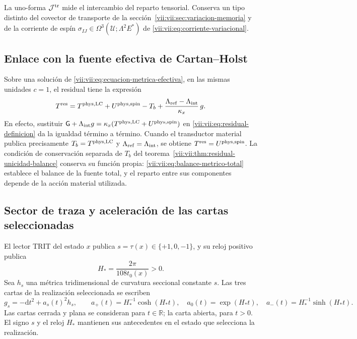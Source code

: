 La uno-forma \(\mathcal J^{\rm tr}\) mide el intercambio del reparto
tensorial. Conserva un tipo distinto del covector de transporte de la
sección~\ref{vii:vii:sec:variacion-memoria} y de la corriente de espín
\(\sigma_{IJ}\in\Omega^3(\mathcal U;\Lambda^2E^*)\) de
\eqref{vii:vii:eq:corriente-variacional}.

\subsection{Enlace con la fuente efectiva de Cartan--Holst}
\label{vii:vii:subsec:residual-fuente-cartan}

Sobre una solución de \eqref{vii:vii:eq:ecuacion-metrica-efectiva}, en las
mismas unidades \(c=1\), el residual tiene la expresión
\begin{equation}
 T^{\rm res}
 =T^{\rm phys,LC}+U^{\rm phys,spin}-T_b
   +\frac{\Lambda_{\rm ref}-\Lambda_{\rm int}}{\kappa_x}\,g.
 \label{vii:vii:eq:residual-composicion-cartan}
\end{equation}
En efecto, sustituir
\(\mathsf G+\Lambda_{\rm int}g
  =\kappa_x(T^{\rm phys,LC}+U^{\rm phys,spin})\)
en \eqref{vii:vii:eq:residual-definicion} da la igualdad término a término.
Cuando el transductor material publica precisamente
\(T_b=T^{\rm phys,LC}\) y \(\Lambda_{\rm ref}=\Lambda_{\rm int}\),
se obtiene \(T^{\rm res}=U^{\rm phys,spin}\).
La condición de conservación separada de \(T_b\) del
teorema~\ref{vii:vii:thm:residual-unicidad-balance} conserva su función
propia: \eqref{vii:vii:eq:balance-metrico-total} establece el balance de la
fuente total, y el reparto entre sus componentes depende de la acción
material utilizada.

\subsection{Sector de traza y aceleración de las cartas seleccionadas}
\label{vii:vii:subsec:residual-aceleracion-ds}

El lector TRIT del estado \(x\) publica \(s=\tau(x)\in\{+1,0,-1\}\),
y su reloj positivo publica
\begin{equation}
 H_*=\frac{2\pi}{108t_0(x)}>0.
 \label{vii:vii:eq:reloj-carta-ds}
\end{equation}
Sea \(h_s\) una métrica tridimensional de curvatura seccional constante
\(s\). Las tres cartas de la realización seleccionada se escriben
\begin{equation}
 g_s=-\mathrm dt^2+a_s(t)^2h_s,\qquad
 a_+(t)=H_*^{-1}\cosh(H_*t),\quad
 a_0(t)=\exp(H_*t),\quad
 a_-(t)=H_*^{-1}\sinh(H_*t).
 \label{vii:vii:eq:cartas-ds-residual}
\end{equation}
Las cartas cerrada y plana se consideran para \(t\in\mathbb R\);
la carta abierta, para \(t>0\). El signo \(s\) y el reloj \(H_*\)
mantienen sus antecedentes en el estado que selecciona la realización.

